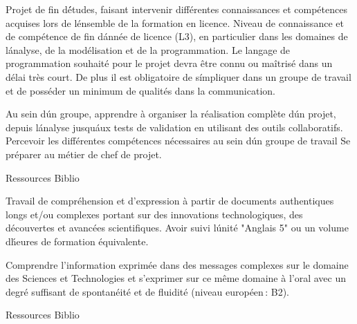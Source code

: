\vfill

{
Projet de fin d\'études, faisant intervenir différentes connaissances et compétences acquises lors de l\'ensemble de la formation en licence.
} 
{Niveau de connaissance et de compétence de fin d\'année de licence (L3), en particulier dans les domaines de l\'analyse, de la modélisation et de la programmation.
Le langage de programmation souhaité pour le projet devra être connu ou maîtrisé dans un délai très court.
De plus il est obligatoire de s\'impliquer dans un groupe de travail et de posséder un minimum de qualités dans la communication.
} 
{\begin{itemize} 
 \ObjItem Au sein d\'un groupe, apprendre à organiser la réalisation complète d\'un projet, depuis l\'analyse jusqu\'aux tests de validation en utilisant des outils collaboratifs. 
 \ObjItem Percevoir les différentes compétences nécessaires au sein d\'un groupe de travail Se préparer au métier de chef de projet. 
\end{itemize} 
} 
{Ressources} 
{Biblio} 
 
\vfill

{
Travail de compréhension et d’expression à partir de documents authentiques longs et/ou complexes portant sur des innovations technologiques, des découvertes et avancées scientifiques.
} 
{Avoir suivi l\'unité "Anglais 5" ou un volume d\'heures de formation équivalente.} 
{\begin{itemize} 
 \ObjItem Comprendre l’information exprimée dans des messages complexes sur le domaine des Sciences et Technologies et s’exprimer sur ce même domaine à l’oral avec un degré suffisant de spontanéité et de fluidité (niveau européen\,: B2). 
\end{itemize} 
} 
{Ressources} 
{Biblio} 
 
